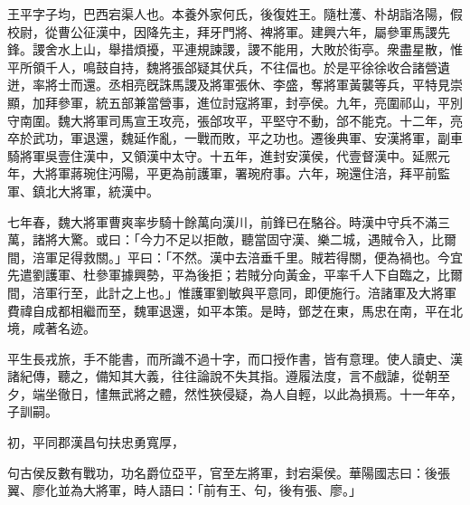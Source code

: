 
\begin{pinyinscope}
王平字子均，巴西宕渠人也。本養外家何氏，後復姓王。隨杜濩、朴胡詣洛陽，假校尉，從曹公征漢中，因降先主，拜牙門將、裨將軍。建興六年，屬參軍馬謖先鋒。謖舍水上山，舉措煩擾，平連規諫謖，謖不能用，大敗於街亭。衆盡星散，惟平所領千人，鳴鼓自持，魏將張郃疑其伏兵，不往偪也。於是平徐徐收合諸營遺迸，率將士而還。丞相亮旣誅馬謖及將軍張休、李盛，奪將軍黃襲等兵，平特見崇顯，加拜參軍，統五部兼當營事，進位討寇將軍，封亭侯。九年，亮圍祁山，平別守南圍。魏大將軍司馬宣王攻亮，張郃攻平，平堅守不動，郃不能克。十二年，亮卒於武功，軍退還，魏延作亂，一戰而敗，平之功也。遷後典軍、安漢將軍，副車騎將軍吳壹住漢中，又領漢中太守。十五年，進封安漢侯，代壹督漢中。延熈元年，大將軍蔣琬住沔陽，平更為前護軍，署琬府事。六年，琬還住涪，拜平前監軍、鎮北大將軍，統漢中。

七年春，魏大將軍曹爽率步騎十餘萬向漢川，前鋒已在駱谷。時漢中守兵不滿三萬，諸將大驚。或曰：「今力不足以拒敵，聽當固守漢、樂二城，遇賊令入，比爾間，涪軍足得救關。」平曰：「不然。漢中去涪垂千里。賊若得關，便為禍也。今宜先遣劉護軍、杜參軍據興勢，平為後拒；若賊分向黃金，平率千人下自臨之，比爾間，涪軍行至，此計之上也。」惟護軍劉敏與平意同，即便施行。涪諸軍及大將軍費禕自成都相繼而至，魏軍退還，如平本策。是時，鄧芝在東，馬忠在南，平在北境，咸著名迹。

平生長戎旅，手不能書，而所識不過十字，而口授作書，皆有意理。使人讀史、漢諸紀傳，聽之，備知其大義，往往論說不失其指。遵履法度，言不戲謔，從朝至夕，端坐徹日，㦎無武將之體，然性狹侵疑，為人自輕，以此為損焉。十一年卒，子訓嗣。

初，平同郡漢昌句扶忠勇寬厚，

句古侯反數有戰功，功名爵位亞平，官至左將軍，封宕渠侯。華陽國志曰：後張翼、廖化並為大將軍，時人語曰：「前有王、句，後有張、廖。」


\end{pinyinscope}